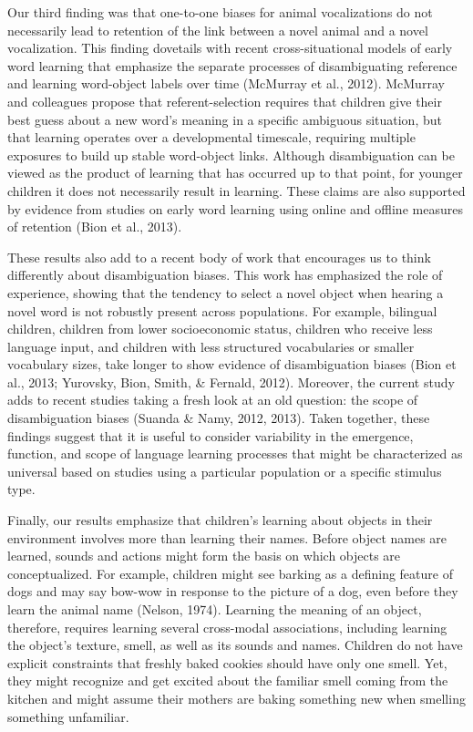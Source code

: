 \documentclass[english,floatsintext,man]{apa6}
\theoremstyle{definition}
\theoremstyle{definition}
\theoremstyle{definition}
\theoremstyle{remark}
\begin{document}
Our third finding was that one-to-one biases for animal vocalizations do
not necessarily lead to retention of the link between a novel animal and
a novel vocalization. This finding dovetails with recent
cross-situational models of early word learning that emphasize the
separate processes of disambiguating reference and learning word-object
labels over time (McMurray et al., 2012). McMurray and colleagues
propose that referent-selection requires that children give their best
guess about a new word's meaning in a specific ambiguous situation, but
that learning operates over a developmental timescale, requiring
multiple exposures to build up stable word-object links. Although
disambiguation can be viewed as the product of learning that has
occurred up to that point, for younger children it does not necessarily
result in learning. These claims are also supported by evidence from
studies on early word learning using online and offline measures of
retention (Bion et al., 2013).

These results also add to a recent body of work that encourages us to
think differently about disambiguation biases. This work has emphasized
the role of experience, showing that the tendency to select a novel
object when hearing a novel word is not robustly present across
populations. For example, bilingual children, children from lower
socioeconomic status, children who receive less language input, and
children with less structured vocabularies or smaller vocabulary sizes,
take longer to show evidence of disambiguation biases (Bion et al.,
2013; Yurovsky, Bion, Smith, \& Fernald, 2012). Moreover, the current
study adds to recent studies taking a fresh look at an old question: the
scope of disambiguation biases (Suanda \& Namy, 2012, 2013). Taken
together, these findings suggest that it is useful to consider
variability in the emergence, function, and scope of language learning
processes that might be characterized as universal based on studies
using a particular population or a specific stimulus type.

Finally, our results emphasize that children's learning about objects in
their environment involves more than learning their names. Before object
names are learned, sounds and actions might form the basis on which
objects are conceptualized. For example, children might see barking as a
defining feature of dogs and may say bow-wow in response to the picture
of a dog, even before they learn the animal name (Nelson, 1974).
Learning the meaning of an object, therefore, requires learning several
cross-modal associations, including learning the object's texture,
smell, as well as its sounds and names. Children do not have explicit
constraints that freshly baked cookies should have only one smell. Yet,
they might recognize and get excited about the familiar smell coming
from the kitchen and might assume their mothers are baking something new
when smelling something unfamiliar.
\end{document}
